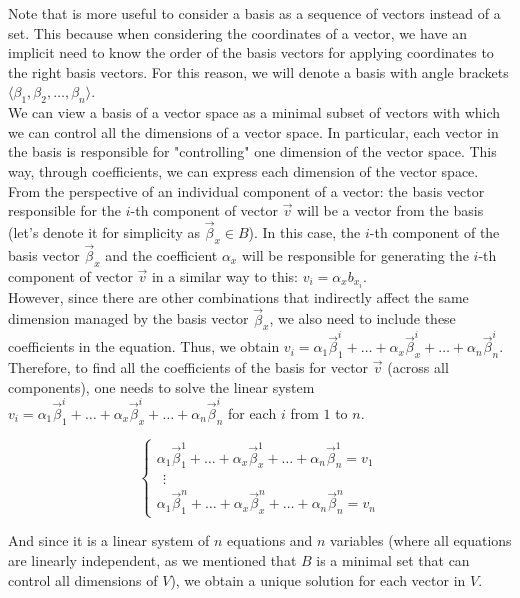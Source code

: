 Note that is more useful to consider a basis as a sequence of vectors instead of a set. This because when considering the coordinates of a vector, we have an implicit need to know the order of the basis vectors for applying coordinates to the right basis vectors. For this reason, we will denote a basis with angle brackets $\langle \beta_1, \beta_2, \dots, \beta_n \rangle$.
\\

We can view a basis of a vector space as a minimal subset of vectors with which we can control all the dimensions of a vector space. In particular, each vector in the basis is responsible for "controlling" one dimension of the vector space. This way, through coefficients, we can express each dimension of the vector space. From the perspective of an individual component of a vector: the basis vector responsible for the $i$-th component of vector $\vec{v}$ will be a vector from the basis (let's denote it for simplicity as $\vec{\beta}_x \in B$). In this case, the $i$-th component of the basis vector $\vec{\beta}_x$ and the coefficient $\alpha_x$ will be responsible for generating the $i$-th component of vector $\vec{v}$ in a similar way to this: $v_i = \alpha_x b_{x_i}$.
\\

However, since there are other combinations that indirectly affect the same dimension managed by the basis vector $\vec{\beta}_x$, we also need to include these coefficients in the equation. Thus, we obtain $v_i = \alpha_1 \vec\beta^i_{1} + \ldots + \alpha_x \vec{\beta}^i_{x} + \ldots + \alpha_n \vec{\beta}^i_{n}$. Therefore, to find all the coefficients of the basis for vector $\vec{v}$ (across all components), one needs to solve the linear system $v_i = \alpha_1 \vec{\beta}^i_{1} + \ldots + \alpha_x \vec{\beta}^i_{x} + \ldots + \alpha_n \vec{\beta}^i_{n}$ for each $i$ from $1$ to $n$.

$$
\begin{cases}
\alpha_1 \vec{\beta}^1_{1} + \ldots + \alpha_x \vec{\beta}^1_{x} + \ldots + \alpha_n \vec{\beta}^1_{n} = v_1 \\
\ \ \vdots\\
\alpha_1 \vec{\beta}^n_{1} + \ldots + \alpha_x \vec{\beta}^n_{x} + \ldots + \alpha_n \vec{\beta}^n_{n} = v_n
\end{cases}
$$

And since it is a linear system of $n$ equations and $n$ variables (where all equations are linearly independent, as we mentioned that ${B}$ is a minimal set that can control all dimensions of $V$), we obtain a unique solution for each vector in $V$.


